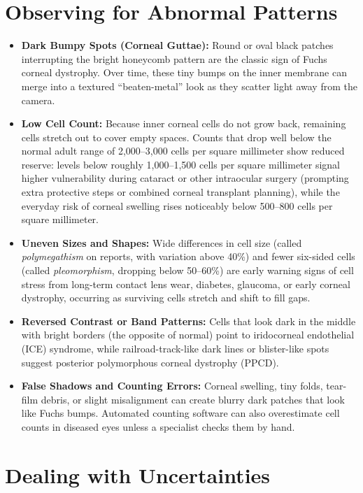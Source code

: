 \section{Observing for Abnormal Patterns}

\begin{itemize}
    \item \textbf{Dark Bumpy Spots (Corneal Guttae):} Round or oval black patches interrupting the bright honeycomb pattern are the classic sign of Fuchs corneal dystrophy. Over time, these tiny bumps on the inner membrane can merge into a textured ``beaten-metal'' look as they scatter light away from the camera.
    \item \textbf{Low Cell Count:} Because inner corneal cells do not grow back, remaining cells stretch out to cover empty spaces. Counts that drop well below the normal adult range of 2,000--3,000 cells per square millimeter show reduced reserve: levels below roughly 1,000--1,500 cells per square millimeter signal higher vulnerability during cataract or other intraocular surgery (prompting extra protective steps or combined corneal transplant planning), while the everyday risk of corneal swelling rises noticeably below 500--800 cells per square millimeter.
    \item \textbf{Uneven Sizes and Shapes:} Wide differences in cell size (called \textit{polymegathism} on reports, with variation above 40\%) and fewer six-sided cells (called \textit{pleomorphism}, dropping below 50--60\%) are early warning signs of cell stress from long-term contact lens wear, diabetes, glaucoma, or early corneal dystrophy, occurring as surviving cells stretch and shift to fill gaps.
    \item \textbf{Reversed Contrast or Band Patterns:} Cells that look dark in the middle with bright borders (the opposite of normal) point to iridocorneal endothelial (ICE) syndrome, while railroad-track-like dark lines or blister-like spots suggest posterior polymorphous corneal dystrophy (PPCD).
    \item \textbf{False Shadows and Counting Errors:} Corneal swelling, tiny folds, tear-film debris, or slight misalignment can create blurry dark patches that look like Fuchs bumps. Automated counting software can also overestimate cell counts in diseased eyes unless a specialist checks them by hand.
\end{itemize}

\section{Dealing with Uncertainties}

